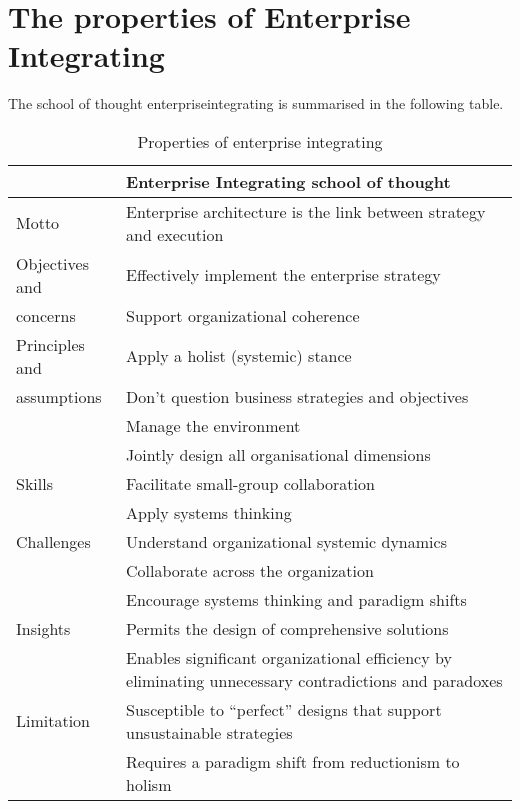 \section{The properties of Enterprise Integrating}
The school of thought \gls{enterpriseintegrating} is summarised in the following table.
\begin{small}
\begin{longtable}{p{}p{}}
	\toprule
	& \textbf{Enterprise Integrating school of thought} \\ \midrule%
	\endhead%
	\hline
	\caption{Properties of enterprise integrating \parencite[p. 39]{Lapalme2012}}
	\label{tab:interpriseintegrating}	
	\endfoot%
	Motto    		& Enterprise architecture is the link between strategy and execution \\
	Objectives and 	& Effectively implement the enterprise strategy \\
	concerns		& Support organizational coherence \\
	Principles and  & Apply a holist (systemic) stance \\
	assumptions		& Don’t question business strategies and objectives  \\
					& Manage the environment \\
					& Jointly design all organisational dimensions \\
	Skills 			& Facilitate small-group collaboration \\
					& Apply systems thinking \\
	Challenges		& Understand organizational systemic dynamics \\
					& Collaborate across the organization \\
					& Encourage systems thinking and paradigm shifts \\
	Insights		& Permits the design of comprehensive solutions \\
					& Enables significant organizational efficiency by eliminating unnecessary contradictions and paradoxes \\
	Limitation		& Susceptible to “perfect” designs that support unsustainable strategies \\
					& Requires a paradigm shift from reductionism to holism \\
	\bottomrule
\end{longtable}
\end{small}
\newpage
